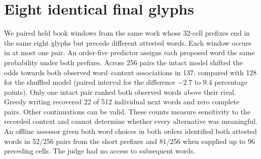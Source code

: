 \section*{Eight identical final glyphs}
We paired held book windows from the same work whose 32-cell prefixes end in the same eight glyphs but precede different attested words. Each window occurs in at most one pair. An order-five predictor assigns each proposed word the same probability under both prefixes. Across 256 pairs the intact model shifted the odds towards both observed word--context associations in 137, compared with 128 for the shuffled model (paired interval for the difference $-2.7$ to $9.4$ percentage points). Only one intact pair ranked both observed words above their rival. Greedy writing recovered 22 of 512 individual next words and zero complete pairs. Other continuations can be valid. These counts measure sensitivity to the recorded context and cannot determine whether every alternative was meaningful.
An offline assessor given both word choices in both orders identified both attested words in 52/256 pairs from the short prefixes and 81/256 when supplied up to 96 preceding cells. The judge had no access to subsequent words.
